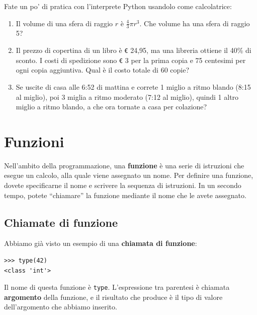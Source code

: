 \documentclass[10pt]{book}
\begin{document}
\vspace{0.2in}
\begin{exercise}

Fate un po' di pratica con l'interprete Python usandolo come calcolatrice:

\begin{enumerate}

\item Il volume di una sfera di raggio $r$ è $\frac{4}{3} \pi r^3$.
  Che volume ha una sfera di raggio 5?

\item Il prezzo di copertina di un libro è \verb"€" 24,95, ma una libreria ottiene il
  40\% di sconto. I costi di spedizione sono \verb"€" 3 per la prima copia e 75 centesimi per ogni copia aggiuntiva. Qual è il costo totale di 60 copie?

\item Se uscite di casa alle 6:52 di mattina e correte 1 miglio a ritmo blando (8:15 al miglio), poi 3 miglia a ritmo moderato (7:12 al miglio), quindi 1 altro miglio a ritmo blando, a che ora tornate a casa per colazione?

\end{enumerate}
\end{exercise}


\chapter{Funzioni}
\label{funcchap}

Nell'ambito della programmazione, una {\bf funzione} è una serie di istruzioni che esegue un calcolo, alla quale viene assegnato un nome.  Per definire una funzione, dovete specificarne il nome e scrivere la sequenza di istruzioni. In un secondo tempo, potete ``chiamare'' la funzione mediante il nome che le avete assegnato. 

\section{Chiamate di funzione}
\label{functionchap}

Abbiamo già visto un esempio di una {\bf chiamata di funzione}:

\begin{verbatim}
>>> type(42)
<class 'int'>
\end{verbatim}
%
Il nome di questa funzione è {\tt type}. L'espressione tra parentesi è chiamata {\bf argomento} della funzione, e il risultato che produce è il tipo di valore dell'argomento che abbiamo inserito.
\end{document}
